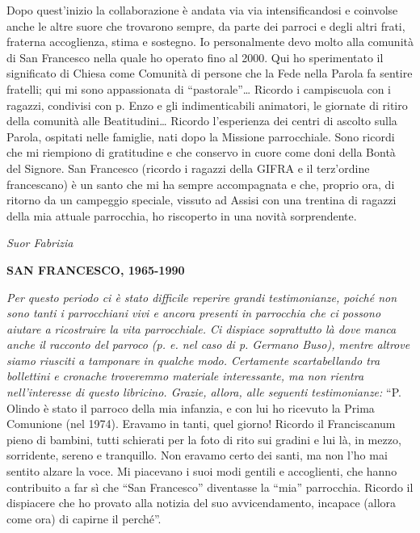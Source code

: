 Dopo quest’inizio la collaborazione è andata via via intensificandosi e coinvolse anche le 
altre suore che trovarono sempre, da parte dei parroci e degli altri frati, fraterna accoglienza, stima e 
sostegno. Io personalmente devo molto alla comunità di San Francesco nella quale ho operato fino 
al 2000. Qui ho sperimentato il significato di Chiesa come Comunità di persone che la Fede nella 
Parola fa sentire fratelli; qui mi sono appassionata di “pastorale”… Ricordo i campiscuola con i 
ragazzi,  condivisi con p. Enzo e gli indimenticabili animatori, le giornate di ritiro della comunità 
alle Beatitudini… Ricordo l’esperienza dei centri di ascolto sulla Parola, ospitati nelle famiglie, nati 
dopo la Missione parrocchiale. Sono ricordi che mi riempiono di gratitudine e che conservo in cuore 
come doni della Bontà del Signore. San Francesco (ricordo i  ragazzi della GIFRA e il terz’ordine 
francescano) è un santo che mi ha sempre accompagnata e che, proprio ora, di ritorno da un 
campeggio speciale, vissuto ad Assisi con una trentina di ragazzi della mia attuale parrocchia, ho 
riscoperto in una novità sorprendente.
\begin{flushright}
\textit{Suor Fabrizia}
\end{flushright}
\bigskip
\begin{center}
\textbf{\Large SAN FRANCESCO, 1965-1990}
\end{center}
\bigbreak
\textit{Per questo periodo ci è stato difficile reperire grandi testimonianze, poiché non sono tanti i
parrocchiani vivi e ancora presenti in parrocchia che ci possono aiutare a ricostruire la vita 
parrocchiale. Ci dispiace soprattutto là dove manca anche il racconto del parroco (p. e. nel caso di 
p. Germano Buso), mentre altrove siamo riusciti a tamponare in qualche modo. Certamente 
scartabellando tra bollettini e cronache troveremmo materiale interessante, ma non rientra 
nell’interesse di questo libricino. Grazie, allora, alle seguenti testimonianze:}
\medbreak
``P. Olindo è stato il parroco della mia infanzia, e con lui ho ricevuto la Prima Comunione 
(nel 1974). Eravamo in tanti, quel giorno! Ricordo il Franciscanum pieno di bambini, tutti schierati 
per la foto di rito sui gradini e lui là, in mezzo, sorridente, sereno e tranquillo.
Non eravamo certo dei santi, ma non l’ho mai sentito alzare la voce.
Mi piacevano i suoi modi gentili e accoglienti, che hanno contribuito a far sì che “San Francesco” 
diventasse la “mia” parrocchia.
Ricordo il dispiacere che ho provato alla notizia del suo avvicendamento, incapace (allora come 
ora) di capirne il perché''.

